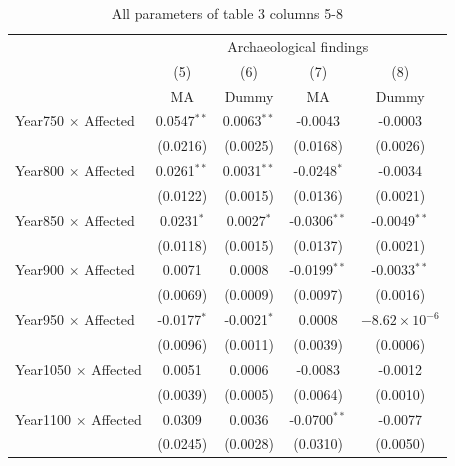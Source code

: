 \begin{table}
\centering
\footnotesize
\caption{All parameters of table 3 columns 5-8} \label{tab:A_arch2}
\begin{tabular}{lcccc}
   \tabularnewline \midrule \midrule
                                                    & \multicolumn{4}{c}{Archaeological findings}\\
                                                    & (5)             & (6)             & (7)                   & (8)\\  
                                                    & MA              & Dummy           & MA                    & Dummy\\
   \midrule
   Year750 $\times$ Affected   & 0.0547$^{**}$   & 0.0063$^{**}$   & -0.0043         & -0.0003\\   
                               & (0.0216)        & (0.0025)        & (0.0168)        & (0.0026)\\   
   Year800 $\times$ Affected   & 0.0261$^{**}$   & 0.0031$^{**}$   & -0.0248$^{*}$   & -0.0034\\   
                               & (0.0122)        & (0.0015)        & (0.0136)        & (0.0021)\\   
   Year850 $\times$ Affected   & 0.0231$^{*}$    & 0.0027$^{*}$    & -0.0306$^{**}$  & -0.0049$^{**}$\\   
                               & (0.0118)        & (0.0015)        & (0.0137)        & (0.0021)\\   
   Year900 $\times$ Affected   & 0.0071          & 0.0008          & -0.0199$^{**}$  & -0.0033$^{**}$\\   
                               & (0.0069)        & (0.0009)        & (0.0097)        & (0.0016)\\   
   Year950 $\times$ Affected   & -0.0177$^{*}$   & -0.0021$^{*}$   & 0.0008          & $-8.62\times 10^{-6}$\\    
                               & (0.0096)        & (0.0011)        & (0.0039)        & (0.0006)\\   
   Year1050 $\times$ Affected  & 0.0051          & 0.0006          & -0.0083         & -0.0012\\   
                               & (0.0039)        & (0.0005)        & (0.0064)        & (0.0010)\\   
   Year1100 $\times$ Affected  & 0.0309          & 0.0036          & -0.0700$^{**}$  & -0.0077\\   
                               & (0.0245)        & (0.0028)        & (0.0310)        & (0.0050)\\   

\end{tabular}
\end{table}
